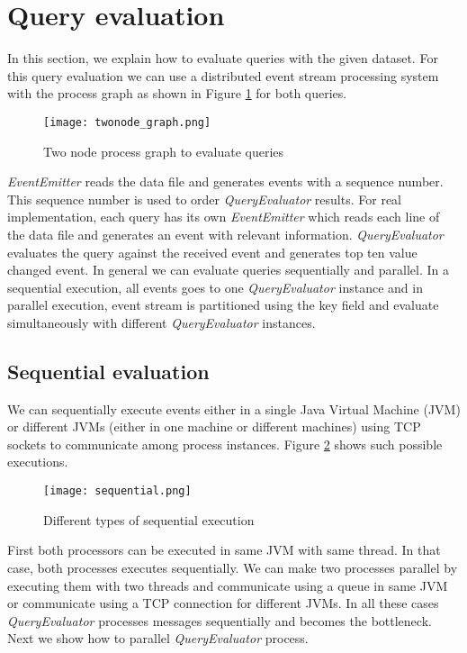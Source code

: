 \section{Query evaluation}

In this section, we explain how to evaluate queries with the given dataset. For this query evaluation we can use a distributed event stream processing system with the process graph as shown in Figure \ref{twonode_graph} for both queries.

\begin{figure}[!t]
        \centering
        \texttt{[image: twonode\_graph.png]}
        \caption{Two node process graph to evaluate queries}
        \label{twonode_graph}
\end{figure}

\textit{EventEmitter} reads the data file and generates events with a sequence number. This sequence number is used to order \textit{QueryEvaluator} results. For real implementation, each query has its own \textit{EventEmitter} which reads each line of the data file and generates an event with relevant information. \textit{QueryEvaluator} evaluates the query against the received event and generates top ten value changed event.  In general we can evaluate queries sequentially and parallel. In a sequential execution, all events goes to one \textit{QueryEvaluator} instance and in parallel execution, event stream is partitioned using the key field and evaluate simultaneously with different \textit{QueryEvaluator} instances.

\subsection{Sequential evaluation}

We can sequentially execute events either in a single Java Virtual Machine (JVM) or different JVMs (either in one machine or different machines) using TCP sockets to communicate among process instances. Figure \ref{sequential} shows such possible executions. 

\begin{figure}[!t]
        \centering
        \texttt{[image: sequential.png]}
        \caption{Different types of sequential execution}
        \label{sequential}
\end{figure}

First both processors can be executed in same JVM with same thread. In that case, both processes executes sequentially. We can make two processes parallel by executing them with two threads and communicate using a queue in same JVM or communicate using a TCP connection for different JVMs. In all these cases \textit{QueryEvaluator} processes messages sequentially and becomes the bottleneck. Next we show how to parallel \textit{QueryEvaluator} process. 

